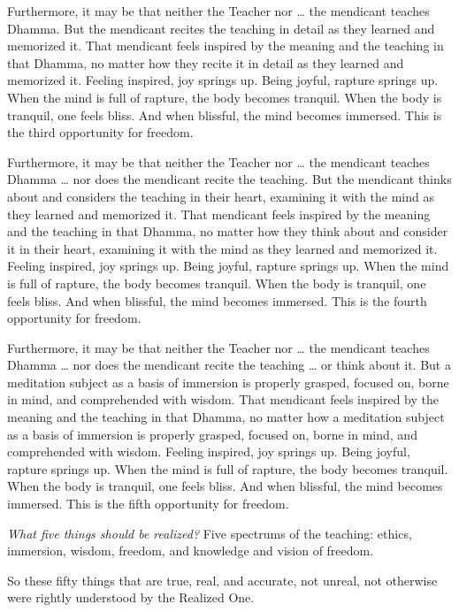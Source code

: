 \documentclass[12pt,openany]{book}%
\begin{document}
Furthermore, it may be that neither the Teacher nor … the mendicant teaches Dhamma. But the mendicant recites the teaching in detail as they learned and memorized it. That mendicant feels inspired by the meaning and the teaching in that Dhamma, no matter how they recite it in detail as they learned and memorized it. Feeling inspired, joy springs up. Being joyful, rapture springs up. When the mind is full of rapture, the body becomes tranquil. When the body is tranquil, one feels bliss. And when blissful, the mind becomes immersed. This is the third opportunity for freedom. 

Furthermore, it may be that neither the Teacher nor … the mendicant teaches Dhamma … nor does the mendicant recite the teaching. But the mendicant thinks about and considers the teaching in their heart, examining it with the mind as they learned and memorized it. That mendicant feels inspired by the meaning and the teaching in that Dhamma, no matter how they think about and consider it in their heart, examining it with the mind as they learned and memorized it. Feeling inspired, joy springs up. Being joyful, rapture springs up. When the mind is full of rapture, the body becomes tranquil. When the body is tranquil, one feels bliss. And when blissful, the mind becomes immersed. This is the fourth opportunity for freedom. 

Furthermore, it may be that neither the Teacher nor … the mendicant teaches Dhamma … nor does the mendicant recite the teaching … or think about it. But a meditation subject as a basis of immersion is properly grasped, focused on, borne in mind, and comprehended with wisdom. That mendicant feels inspired by the meaning and the teaching in that Dhamma, no matter how a meditation subject as a basis of immersion is properly grasped, focused on, borne in mind, and comprehended with wisdom. Feeling inspired, joy springs up. Being joyful, rapture springs up. When the mind is full of rapture, the body becomes tranquil. When the body is tranquil, one feels bliss. And when blissful, the mind becomes immersed. This is the fifth opportunity for freedom. 

\emph{What five things should be realized?} Five spectrums of the teaching: ethics, immersion, wisdom, freedom, and knowledge and vision of freedom. 

So these fifty things that are true, real, and accurate, not unreal, not otherwise were rightly understood by the Realized One. 
\end{document}
